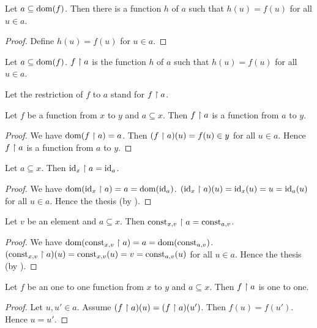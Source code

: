 \documentclass[../../set-theory.ftl.tex]{subfiles}
\begin{document}
  \begin{forthel}
    \begin{lemma}
      Let $a \subseteq \operatorname{dom}(f)$.
      Then there is a function $h$ of $a$ such that $h(u) = f(u)$ for all $u \in a$.
    \end{lemma}
    \begin{proof}
      Define $h(u) = f(u)$ for $u \in a$.
    \end{proof}

    \begin{definition}
      Let $a \subseteq \operatorname{dom}(f)$.
      $f \upharpoonright a$ is the function $h$ of $a$ such that $h(u) = f(u)$ for all $u \in a$.
    \end{definition}

    Let the restriction of $f$ to $a$ stand for $f \upharpoonright a$.

    \begin{proposition}\label{SetTheory_02_01_589280}
      Let $f$ be a function from $x$ to $y$ and $a \subseteq x$.
      Then $f \upharpoonright a$ is a function from $a$ to $y$.
    \end{proposition}
    \begin{proof}
      We have $\operatorname{dom}(f \upharpoonright a) = a$.
      Then $(f \upharpoonright a)(u) = f(u) \in y$ for all $u \in a$.
      Hence $f \upharpoonright a$ is a function from $a$ to $y$.
    \end{proof}

    \begin{proposition}\label{SetTheory_02_01_795968}
      Let $a \subseteq x$.
      Then $\operatorname{id}_{x} \upharpoonright a = \operatorname{id}_{a}$.
    \end{proposition}
    \begin{proof}
      We have $\operatorname{dom}(\operatorname{id}_{x} \upharpoonright a) = a = \operatorname{dom}(\operatorname{id}_{a})$.
      $(\operatorname{id}_{x} \upharpoonright a)(u) = \operatorname{id}_{x}(u) = u = \operatorname{id}_{a}(u)$ for all $u \in a$.
      Hence the thesis (by ).
    \end{proof}

    \begin{proposition}\label{SetTheory_02_01_575265}
      Let $v$ be an element and $a \subseteq x$.
      Then $\mbox{const}_{x,v} \upharpoonright a = \mbox{const}_{a,v}$.
    \end{proposition}
    \begin{proof}
      We have $\operatorname{dom}(\mbox{const}_{x,v} \upharpoonright a) = a = \operatorname{dom}(\mbox{const}_{a,v})$.
      $(\mbox{const}_{x,v} \upharpoonright a)(u) = \mbox{const}_{x,v}(u) = v = \mbox{const}_{a,v}(u)$ for all $u \in a$.
      Hence the thesis (by ).
    \end{proof}

    \begin{proposition}\label{SetTheory_02_01_507691}
      Let $f$ be an one to one function from $x$ to $y$ and $a \subseteq x$.
      Then $f \upharpoonright a$ is one to one.
    \end{proposition}
    \begin{proof}
      Let $u,u' \in a$.
      Assume $(f \upharpoonright a)(u) = (f \upharpoonright a)(u')$.
      Then $f(u) = f(u')$.
      Hence $u = u'$.
    \end{proof}
  \end{forthel}
\end{document}
